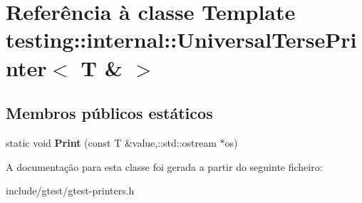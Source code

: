 \hypertarget{classtesting_1_1internal_1_1UniversalTersePrinter_3_01T_01_6_01_4}{\section{Referência à classe Template testing\-:\-:internal\-:\-:Universal\-Terse\-Printer$<$ T \& $>$}
\label{classtesting_1_1internal_1_1UniversalTersePrinter_3_01T_01_6_01_4}
}
\subsection*{Membros públicos estáticos}
\begin{DoxyCompactItemize}
\item 
\hypertarget{classtesting_1_1internal_1_1UniversalTersePrinter_3_01T_01_6_01_4_a5f0d2e50bb18c00d019389fca869b9d0}{static void {\bfseries Print} (const T \&value,\-::std\-::ostream $\ast$os)}\label{classtesting_1_1internal_1_1UniversalTersePrinter_3_01T_01_6_01_4_a5f0d2e50bb18c00d019389fca869b9d0}

\end{DoxyCompactItemize}


A documentação para esta classe foi gerada a partir do seguinte ficheiro\-:\begin{DoxyCompactItemize}
\item 
include/gtest/gtest-\/printers.\-h\end{DoxyCompactItemize}
